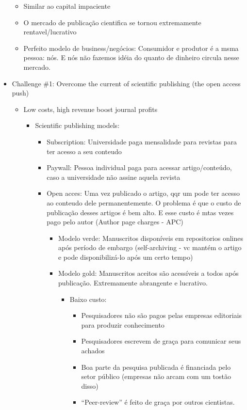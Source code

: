 \documentclass[11pt]{article}
\begin{document}
\begin{itemize}
\begin{itemize}
\item Similar ao capital impaciente
\item O mercado de publicação cientifica se tornou extremamente rentavel/lucrativo
\item Perfeito modelo de business/negócios: Consumidor e produtor é a msma pessoa: nós. E nós não fazemos idéia do quanto de dinheiro circula nesse mercado.
\end{itemize}
\item Challenge \#1: Overcome the current of scientific publishing (the open access push)
\begin{itemize}
\item Low costs, high revenue  boost journal profits
\begin{itemize}
\item Scientific publishing models:
\begin{itemize}
\item Subscription: Universidade paga mensalidade para revistas para ter acesso a seu conteudo
\item Paywall: Pessoa individual paga para acessar artigo/conteúdo, caso a universidade não assine aquela revista
\item Open acces: Uma vez publicado o artigo, qqr um pode ter acesso ao conteudo dele permanentemente. O problema é que o custo de publicação desses artigos é bem alto. E esse custo é mtas vezes pago pelo autor (Author page charges - APC)
\begin{itemize}
\item Modelo verde: Manuscritos disponíveis em repositorios onlines após período de embargo (self-archiving - vc mantém o artigo e pode disponibilizá-lo após um certo tempo)
\item Modelo gold: Manuscritos aceitos são acessíveis a todos após publicação. Extremamente abrangente e lucrativo.
\begin{itemize}
\item Baixo custo:
\begin{itemize}
\item Pesquisadores não são pagos pelas empresas editoriais para produzir conhecimento
\item Pesquisadores escrevem de graça para comunicar seus achados
\item Boa parte da pesquisa publicada é financiada pelo setor público (empresas não arcam com um tostão disso)
\item ``Peer-review'' é feito de graça por outros cientistas.

\end{itemize}
\end{itemize}
\end{itemize}
\end{itemize}
\end{itemize}
\end{itemize}
\end{itemize}
\end{document}
